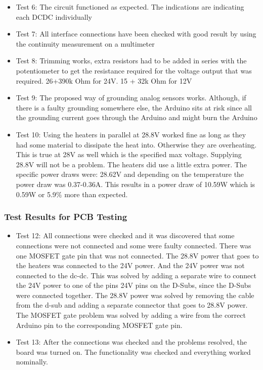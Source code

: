 \documentclass[a4paper,12pt,oneside]{article}
\begin{document}
\begin{appendices}
\begin{itemize}
\item Test 6: The circuit functioned as expected. The indications are indicating each DCDC individually
\item Test 7: All interface connections have been checked with good result by using the continuity measurement on a multimeter
\item Test 8: Trimming works, extra resistors had to be added in series with the potentiometer to get the resistance required for the voltage output that was required. 26+390k Ohm for 24V. 15 + 32k Ohm for 12V
\item Test 9: The proposed way of grounding analog sensors works. Although, if there is a faulty grounding somewhere else, the Arduino sits at risk since all the grounding current goes through the Arduino and might burn the Arduino
\item Test 10: Using the heaters in parallel at 28.8V worked fine as long as they had some material to dissipate the heat into. Otherwise they are overheating. This is true at 28V as well which is the specified max voltage. Supplying 28.8V will not be a problem. The heaters did use a little extra power. The specific power draws were: 28.62V and depending on the temperature the power draw was 0.37-0.36A. This results in a power draw of 10.59W which is 0.59W or 5.9$\%$ more than expected.

\end{itemize}
\subsubsection{Test Results for PCB Testing}
\label{sec:Test-Results-PCB-Testing}
\begin{itemize}
    \item Test 12: All connections were checked and it was discovered that some connections were not connected and some were faulty connected. There was one MOSFET gate pin that was not connected. The 28.8V power that goes to the heaters was connected to the 24V power. And the 24V power was not connected to the dc-dc. This was solved by adding a separate wire to connect the 24V power to one of the pins 24V pins on the D-Subs, since the D-Subs were connected together. The 28.8V power was solved by removing the cable from the d-sub and adding a separate connector that goes to 28.8V power. The MOSFET gate problem was solved by adding a wire from the correct Arduino pin to the corresponding MOSFET gate pin.
    \item Test 13: After the connections was checked and the problems resolved, the board was turned on. The functionality was checked and everything worked nominally.
\end{itemize}


\end{appendices}
\end{document}
